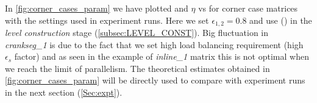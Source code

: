 In \cref{fig:corner_cases_param} we have plotted \threadEff and $\eta$ vs \nthreads for corner case matrices with the settings used in experiment runs. Here we set $\epsilon_{1,2}=0.8$ and use \RCM (\RCMfull) in the \emph{level construction} stage (\cref{subsec:LEVEL_CONST}). Big fluctuation in \emph{crankseg\_1} is due to the fact that we set high load balancing requirement (high $\epsilon_s$ factor) and as seen in the example of \emph{inline\_1} matrix this is not optimal when we reach the limit of parallelism. The theoretical estimates obtained in \cref{fig:corner_cases_param} will be directly used to compare with experiment runs in the next section (\cref{Sec:expt}).

